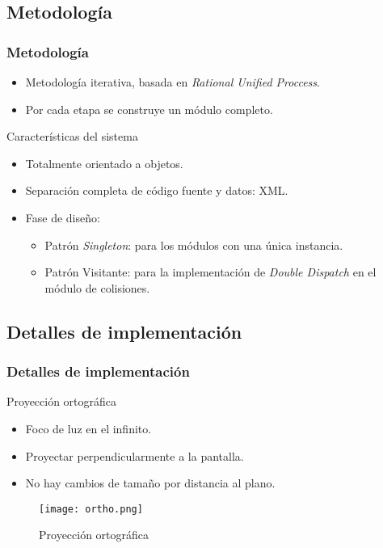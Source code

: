 \subsection{Metodología}

\begin{frame}
\frametitle{Metodología}
	\begin{itemize}
		\item Metodología iterativa, basada en \textit{Rational Unified Proccess}.
		\item Por cada etapa se construye un módulo completo.
	\end{itemize}
	\pause
	\begin{block}{Características del sistema}
		\begin{itemize}
			\item Totalmente orientado a objetos.
			\item Separación completa de código fuente y datos: XML.
			\item Fase de diseño:
			\begin{itemize}
				\item Patrón \textit{Singleton}: para los módulos con una única instancia.
				\item Patrón Visitante: para la implementación de \textit{Double Dispatch} en el módulo de colisiones.
			\end{itemize}
		\end{itemize}
	\end{block}
\end{frame}

\subsection{Detalles de implementación}

\begin{frame}
\frametitle{Detalles de implementación}
	\begin{block}{Proyección ortográfica}
		\begin{itemize}
			\item Foco de luz en el infinito.
			\item Proyectar perpendicularmente a la pantalla.
			\item No hay cambios de tamaño por distancia al plano.
		\end{itemize}
	\end{block}
	\begin{figure}[H]
		\label{ortho}
		\begin{center}
		\texttt{[image: ortho.png]}
		\end{center}
		\caption{Proyección ortográfica}
	\end{figure}
\end{frame}

